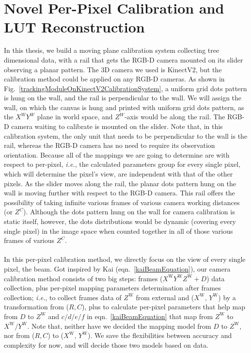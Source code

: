 \section{Novel Per-Pixel Calibration and LUT Reconstruction}
\label{sectionPerPixelCalibration}
In this thesis, we build a moving plane calibration system collecting tree dimensional data, with a rail that gets the RGB-D camera mounted on its slider observing a planar pattern. The 3D camera we used is KinectV2, but the calibration method could be applied on any RGB-D cameras. As shown in Fig.~\ref{trackingModuleOnKinectV2CalibrationSystem}, a uniform grid dots pattern is hung on the wall, and the rail is perpendicular to the wall. We will assign the wall, on which the canvas is hung and printed with uniform grid dots pattern, as the \(X^WY^W\) plane in world space, and \(Z^W\)-axis would be along the rail. The RGB-D camera waiting to calibrate is mounted on the slider. Note that, in this calibration system, the only unit that needs to be perpendicular to the wall is the rail, whereas the RGB-D camera has no need to require its observation orientation. Because all of the mappings we are going to determine are with respect to per-pixel, \textit{i.e.}, the calculated parameters group for every single pixel, which will determine the pixel's view, are independent with that of the other pixels. As the slider moves along the rail, the planar dots pattern hung on the wall is moving further with respect to the RGB-D camera. This rail offers the possibility of taking infinite various frames of various camera working distances (or \(Z^C\)). Although the dots pattern hung on the wall for camera calibration is static itself, however, the dots distributions would be dynamic (covering every single pixel) in the image space when counted together in all of those various frames of various \(Z^C\). 
\\\\\indent%
In this per-pixel calibration method, we directly focus on the view of every single pixel, the beam. Got inspired by Kai (eqn.~\ref{kaiBeamEquation}), our camera calibration method consists of two big steps: frames (\(X^\text{W}Y^\text{W}Z^\text{W}+D\)) data collection, plus per-pixel mapping parameters determination after frames collection; \textit{i.e.}, to collect frames data of \(Z^\text{W}\) from external and (\(X^\text{W}, \, Y^\text{W}\)) by a transformation from (\(R, C\)), plus to calculate per-pixel parameters that help map from \(D\) to \(Z^\text{W}\) and \(c/d/e/f\) in eqn.~\ref{kaiBeamEquation} that map from \(Z^\text{W}\) to \(X^\text{W}/Y^\text{W}\). Note that, neither have we decided the mapping model from \(D\) to \(Z^\text{W}\), nor from (\(R, C\)) to (\(X^\text{W}, \, Y^\text{W}\)). We save the flexibilities between accuracy and complexity for now, and will decide those two models based on data.
